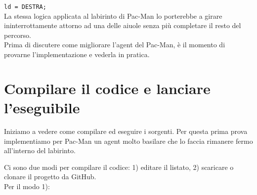 \documentclass[8pt]{book}
\begin{document}
\texttt{ld = DESTRA;}\\
\newline
La stessa logica applicata al labirinto di Pac-Man lo porterebbe a girare ininterrottamente attorno ad una delle aiuole senza più completare il resto del percorso.\\

Prima di discutere come migliorare l'agent del Pac-Man, è il momento di provarne l'implementazione e vederla in pratica.


\section{Compilare il codice e lanciare l'eseguibile}

Iniziamo a vedere come compilare ed eseguire i sorgenti. Per questa prima prova implementiamo per Pac-Man un agent molto basilare che lo faccia rimanere fermo all'interno del labirinto.

Ci sono due modi per compilare il codice: 1) editare il listato, 2) scaricare o clonare il progetto da GitHub.\\
Per il modo 1):
\end{document}
